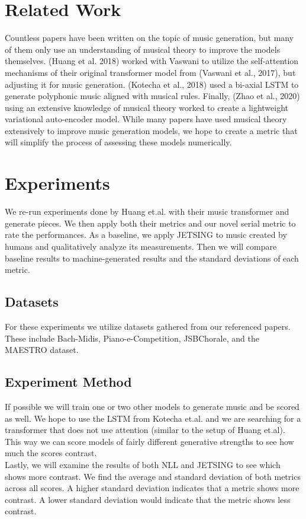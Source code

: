 \documentclass[11pt]{article}
\begin{document}
\section{Related Work}
Countless papers have been written on the topic of music generation, but many of them only use an understanding of musical theory to improve the models themselves. (Huang et al. 2018) worked with Vaswani to utilize the self-attention mechanisms of their original transformer model from (Vaswani et al., 2017), but adjusting it for music generation. (Kotecha et al., 2018) used a bi-axial LSTM to generate polyphonic music aligned with musical rules. Finally, (Zhao et al., 2020) using an extensive knowledge of musical theory worked to create a lightweight variational auto-encoder model. While many papers have used musical theory extensively to improve music generation models, we hope to create a metric that will simplify the process of assessing these models numerically.

\section{Experiments}
We re-run experiments done by Huang et.al. with their music transformer and generate pieces. We then apply both their metrics and our novel serial metric to rate the performances. As a baseline, we apply JETSING to music created by humans and qualitatively analyze its measurements. Then we will compare baseline results to machine-generated results and the standard deviations of each metric.

\subsection{Datasets}
For these experiments we utilize datasets gathered from our referenced papers. These include Bach-Midis, Piano-e-Competition, JSBChorale, and the MAESTRO dataset.

\subsection{Experiment Method}
If possible we will train one or two other models to generate music and be scored as well. We hope to use the LSTM from Kotecha et.al. and we are searching for a transformer that does not use attention (similar to the setup of Huang et.al). This way we can score models of fairly different generative strengths to see how much the scores contrast.
\\ \indent Lastly, we will examine the results of both NLL and JETSING to see which shows more contrast. We find the average and standard deviation of both metrics across all scores. A higher standard deviation indicates that a metric shows more contrast. A lower standard deviation would indicate that the metric shows less contrast.
\end{document}
